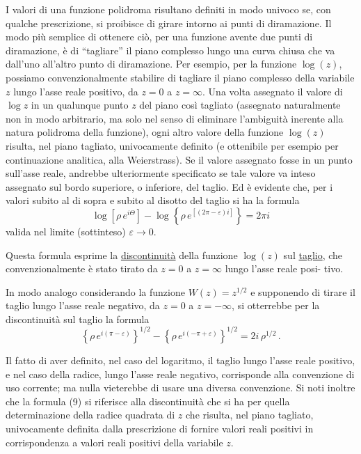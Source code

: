 \documentclass[11pt, a4paper]{book}
\numberwithin{equation}{section}
\begin{document}
I valori di una funzione polidroma risultano definiti in modo univoco se, con qualche prescrizione, si proibisce di girare intorno ai punti di diramazione. Il modo più semplice di ottenere ciò, per una funzione avente due punti di diramazione, è di ``tagliare'' il piano complesso lungo una curva chiusa che va dall'uno all'altro punto di diramazione. Per esempio, per la funzione $\log(z)$, possiamo convenzionalmente stabilire di tagliare il piano complesso della variabile $z$ lungo l'asse reale positivo, da $z=0$ a $z=\infty$. Una volta assegnato il valore di $\log z$ in un qualunque punto $z$ del piano così tagliato (assegnato naturalmente non in modo arbitrario, ma solo nel senso di eliminare l'ambiguità inerente alla natura polidroma della funzione), ogni altro valore della funzione $\log(z)$ risulta, nel piano tagliato, univocamente definito (e ottenibile per esempio per continuazione analitica, alla Weierstrass). Se il valore assegnato fosse in un punto sull'asse reale, andrebbe ulteriormente specificato se tale valore va inteso assegnato sul bordo superiore, o inferiore, del taglio. Ed è evidente che, per i valori subito al di sopra e subito al disotto del taglio si ha la formula
\begin{equation}
\log\!\left[\rho\,e^{i\Theta}\right] - \log\!\left\{\rho\,e^{[(2\pi-\varepsilon)i]}\right\} = 2\pi i \tag{8}
\end{equation}
valida nel limite (sottinteso) $\varepsilon \to 0$.

Questa formula esprime la \underline{discontinuità} della funzione $\log(z)$ sul \underline{taglio}, che convenzionalmente è stato tirato da $z=0$ a $z=\infty$ lungo l'asse reale posi-%
tivo.

In modo analogo considerando la funzione $W(z) = z^{1/2}$ e supponendo di tirare il taglio lungo l'asse reale negativo, da $z=0$ a $z=-\infty$, si otterrebbe per la discontinuità sul taglio la formula
\begin{equation}
\left\{\rho\,e^{i(\pi-\varepsilon)}\right\}^{1/2} - \left\{\rho\,e^{i(-\pi+\varepsilon)}\right\}^{1/2} = 2i\,\rho^{1/2}\,. \tag{9}
\end{equation}

Il fatto di aver definito, nel caso del logaritmo, il taglio lungo l'asse reale positivo, e nel caso della radice, lungo l'asse reale negativo, corrisponde alla convenzione di uso corrente; ma nulla vieterebbe di usare una diversa convenzione. Si noti inoltre che la formula (9) si riferisce alla discontinuità che si ha per quella determinazione della radice quadrata di $z$ che risulta, nel piano tagliato, univocamente definita dalla prescrizione di fornire valori reali positivi in corrispondenza a valori reali positivi della variabile $z$.
\end{document}
